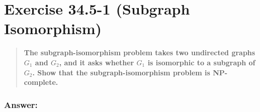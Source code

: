 \documentclass[titlepage]{article}\usepackage[]{graphicx}\usepackage[]{color}
\begin{document}
\section{Exercise 34.5-1 (Subgraph Isomorphism)}
  \begin{quote}
    \textbf{The subgraph-isomorphism problem takes two undirected graphs $G_1$ and
    $G_2$, and it asks whether $G_1$ is isomorphic to a subgraph of $G_2$. Show that the
    subgraph-isomorphism problem is NP-complete.}
  \end{quote}

  \subsubsection{Answer:}
  \vspace{9cm}
\end{document}

